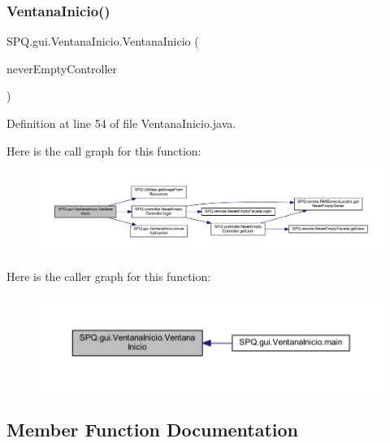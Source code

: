 \subsubsection{\texorpdfstring{Ventana\+Inicio()}{VentanaInicio()}}
{\footnotesize\ttfamily S\+P\+Q.\+gui.\+Ventana\+Inicio.\+Ventana\+Inicio (\begin{DoxyParamCaption}\item[{\mbox{\hyperlink{class_s_p_q_1_1controller_1_1_never_empty_controller}{Never\+Empty\+Controller}}}]{never\+Empty\+Controller }\end{DoxyParamCaption})}



Definition at line 54 of file Ventana\+Inicio.\+java.

Here is the call graph for this function\+:\nopagebreak
\begin{figure}[H]
\begin{center}
\leavevmode
\includegraphics[width=350pt]{class_s_p_q_1_1gui_1_1_ventana_inicio_ab74166cbe23810e4b8586849fb86b54e_cgraph}
\end{center}
\end{figure}
Here is the caller graph for this function\+:\nopagebreak
\begin{figure}[H]
\begin{center}
\leavevmode
\includegraphics[width=350pt]{class_s_p_q_1_1gui_1_1_ventana_inicio_ab74166cbe23810e4b8586849fb86b54e_icgraph}
\end{center}
\end{figure}


\subsection{Member Function Documentation}
\mbox{\label{class_s_p_q_1_1gui_1_1_ventana_inicio_a0588d157580852e153c5dd2291645173}} 
